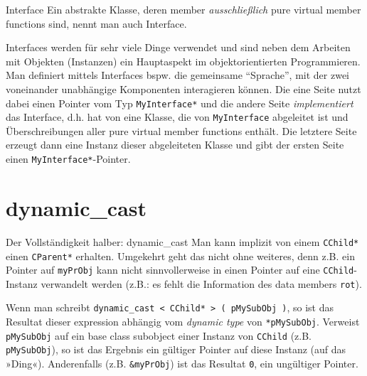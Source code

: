 \begin{frame}[fragile]{Interface}
	Ein abstrakte Klasse, deren member \emph{ausschließlich} pure virtual member functions sind, nennt man auch Interface.
	
	\pause
	\vspace{1em}
	
	Interfaces werden für sehr viele Dinge verwendet und sind neben dem Arbeiten mit Objekten (Instanzen) ein Hauptaspekt im objektorientierten Programmieren. Man definiert mittels Interfaces bspw. die gemeinsame \enquote{Sprache}, mit der zwei voneinander unabhängige Komponenten interagieren können. Die eine Seite nutzt dabei einen Pointer vom Typ \verb|MyInterface*| und die andere Seite \emph{implementiert} das Interface, d.h. hat von eine Klasse, die von \verb|MyInterface| abgeleitet ist und Überschreibungen aller pure virtual member functions enthält. Die letztere Seite erzeugt dann eine Instanz dieser abgeleiteten Klasse und gibt der ersten Seite einen \verb|MyInterface*|-Pointer.
\end{frame}


\section{dynamic\_cast}

\begin{frame}[fragile]{Der Vollständigkeit halber: dynamic\_cast}
	Man kann implizit von einem \verb|CChild*| einen \verb|CParent*| erhalten. Umgekehrt geht das nicht ohne weiteres, denn z.B. ein Pointer auf \verb|myPrObj| kann nicht sinnvollerweise in einen Pointer auf eine \verb|CChild|-Instanz verwandelt werden (z.B.: es fehlt die Information des data members \verb|rot|).
	
	\pause
	\vspace{1em}
	
	Wenn man schreibt \verb|dynamic_cast < CChild* > ( pMySubObj )|, so ist das Resultat dieser expression abhängig vom \emph{dynamic type} von \verb|*pMySubObj|. Verweist \verb|pMySubObj| auf ein base class subobject einer Instanz von \verb|CChild| (z.B. \verb|pMySubObj|), so ist das Ergebnis ein gültiger Pointer auf diese Instanz (auf das »Ding«). Anderenfalls (z.B. \verb|&myPrObj|) ist das Resultat \verb|0|, ein ungültiger Pointer.
\end{frame}
